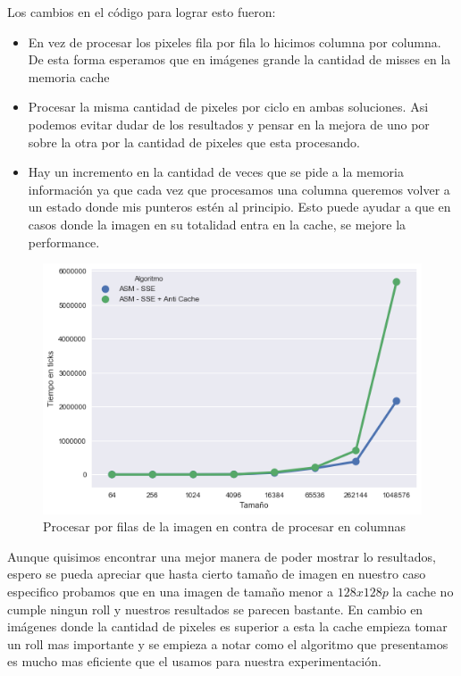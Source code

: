 Los cambios en el código para lograr esto fueron:
\begin{itemize}
\item En vez de procesar los pixeles fila por fila lo hicimos columna por columna. De esta forma esperamos que en imágenes grande la cantidad de misses en la memoria cache 

\item Procesar la misma cantidad de pixeles por ciclo en ambas soluciones. Asi podemos evitar dudar de los resultados y pensar en la mejora de uno por sobre la otra por la cantidad de pixeles que esta procesando.

\item Hay un incremento en la cantidad de veces que se pide a la memoria información ya que cada vez que procesamos una columna queremos volver a un estado donde mis punteros estén al principio. Esto puede ayudar a que en casos donde la imagen en su totalidad entra en la cache, se mejore la performance. 
\end{itemize}
\begin{figure}[H]
	\centering
	\includegraphics[scale=0.5]{img/fourCombine_antiCache.png}
	\caption{Procesar por filas de la imagen en contra de procesar en columnas}
	\label{fourCombine_antiCache}
\end{figure}

Aunque quisimos encontrar una mejor manera de poder mostrar lo resultados, espero se pueda apreciar que hasta cierto tamaño de imagen en nuestro caso especifico probamos que en una imagen de tamaño menor a  $128x128p$ la cache no cumple ningun roll y nuestros resultados se parecen bastante. En cambio en imágenes donde la cantidad de pixeles es superior a esta la cache empieza tomar un roll mas importante y se empieza a notar como el algoritmo que presentamos es mucho mas eficiente que el usamos para nuestra experimentación.

